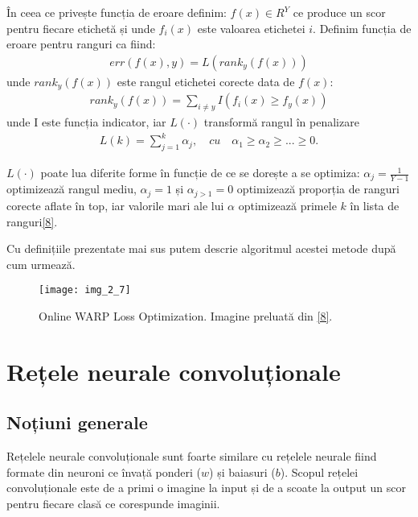În ceea ce privește funcția de eroare definim: $f(x) \in R^Y$ ce produce un scor pentru fiecare etichetă și unde $f_i(x)$ este valoarea etichetei $i$. Definim funcția de eroare pentru ranguri ca fiind:
\begin{align}
	err(f(x),y) = L(rank_y(f(x)))
\end{align}
unde $rank_y(f(x))$ este rangul etichetei corecte data de $f(x)$:
\begin{align}
	rank_y(f(x)) = \sum_{i \neq y}I(f_i(x) \geq f_y(x))
\end{align}
unde I este funcția indicator, iar $L(\cdot)$ transformă rangul în penalizare
\begin{align}
	L(k) = \sum_{j=1}^k\alpha_j, \quad cu \quad \alpha_1 \geq \alpha_2 \geq ... \geq 0.
\end{align}

$L(\cdot)$ poate lua diferite forme în funcție de ce se dorește a se optimiza: $\alpha_j=\frac{1}{Y-1}$ optimizează rangul mediu, $\alpha_j=1$ și $\alpha_{j>1}=0$ optimizează proporția de ranguri corecte aflate în top, iar valorile mari ale lui $\alpha$ optimizează primele $k$ în lista de ranguri\hyperlink{JasonWestonSamyBengioNicolasUsunier}{[8]}.

\vspace{5mm}

Cu definițiile prezentate mai sus putem descrie algoritmul acestei metode după cum urmează.

\begin{figure}[!h]
	\centering
	\texttt{[image: img\_2\_7]}
	\caption[Online WARP Loss Optimization]{Online WARP Loss Optimization. Imagine preluată din \hyperlink{JasonWestonSamyBengioNicolasUsunier}{[8]}.}
\end{figure} 

\section{Rețele neurale convoluționale}

\subsection{Noțiuni generale}

Rețelele neurale convoluționale sunt foarte similare cu rețelele neurale fiind formate din neuroni ce învață ponderi ($w$) și baiasuri ($b$). Scopul rețelei convoluționale este de a primi o imagine la input și de a scoate la output un scor pentru fiecare clasă ce corespunde imaginii. 

